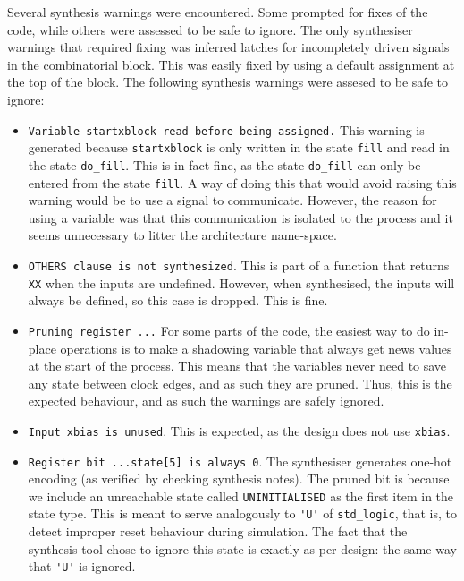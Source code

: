 \documentclass[]{article}
\begin{document}
Several synthesis warnings were encountered. Some prompted for fixes of the code, while others were assessed to be safe to ignore. The only synthesiser warnings that required fixing was inferred latches for incompletely driven signals in the combinatorial block. This was easily fixed by using a default assignment at the top of the block. The following synthesis warnings were assesed to be safe to ignore:
\begin{itemize}
	\item \verb"Variable startxblock read before being assigned." This warning is generated because \verb"startxblock" is only written in the state \verb"fill" and read in the state \verb"do_fill". This is in fact fine, as the state \verb"do_fill" can only be entered from the state \verb"fill". A way of doing this that would avoid raising this warning would be to use a signal to communicate. However, the reason for using a variable was that this communication is isolated to the process and it seems unnecessary to litter the architecture name-space.
	\item \verb"OTHERS clause is not synthesized". This is part of a function that returns \verb"XX" when the inputs are undefined. However, when synthesised, the inputs will always be defined, so this case is dropped. This is fine.
	\item \verb"Pruning register ..." For some parts of the code, the easiest way to do in-place operations is to make a shadowing variable that always get news values at the start of the process. This means that the variables never need to save any state between clock edges, and as such they are pruned. Thus, this is the expected behaviour, and as such the warnings are safely ignored.
	\item \verb"Input xbias is unused". This is expected, as the design does not use \verb"xbias".
	\item \verb"Register bit ...state[5] is always 0". The synthesiser generates one-hot encoding (as verified by checking synthesis notes). The pruned bit is because we include an unreachable state called \verb"UNINITIALISED" as the first item in the state type. This is meant to serve analogously to \verb"'U'" of \verb"std_logic", that is, to detect improper reset behaviour during simulation. The fact that the synthesis tool chose to ignore this state is exactly as per design: the same way that \verb"'U'" is ignored.
\end{itemize}


\end{document}
